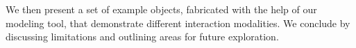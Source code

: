 We then present a set of example objects, fabricated with the help of our modeling tool, that demonstrate different interaction modalities. We conclude by discussing limitations and outlining areas for future exploration. 
